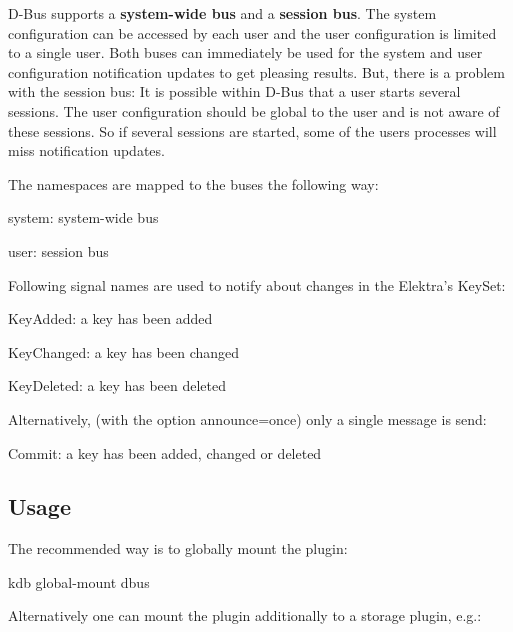 D-\/\+Bus supports a {\bfseries system-\/wide bus} and a {\bfseries session bus}. The system configuration can be accessed by each user and the user configuration is limited to a single user. Both buses can immediately be used for the system and user configuration notification updates to get pleasing results. But, there is a problem with the session bus\+: It is possible within D-\/\+Bus that a user starts several sessions. The user configuration should be global to the user and is not aware of these sessions. So if several sessions are started, some of the user\textquotesingle{}s processes will miss notification updates.

The namespaces are mapped to the buses the following way\+:


\begin{DoxyItemize}
\item system\+: system-\/wide bus
\item user\+: session bus
\end{DoxyItemize}

Following signal names are used to notify about changes in the Elektra’s Key\+Set\+:


\begin{DoxyItemize}
\item Key\+Added\+: a key has been added
\item Key\+Changed\+: a key has been changed
\item Key\+Deleted\+: a key has been deleted
\end{DoxyItemize}

Alternatively, (with the option announce=once) only a single message is send\+:


\begin{DoxyItemize}
\item Commit\+: a key has been added, changed or deleted
\end{DoxyItemize}

\subsection*{Usage}

The recommended way is to globally mount the plugin\+:


\begin{DoxyCode}
kdb global-mount dbus
\end{DoxyCode}


Alternatively one can mount the plugin additionally to a storage plugin, e.\+g.\+:


